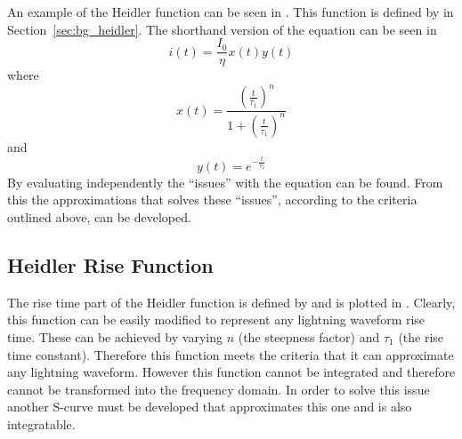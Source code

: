 An example of the Heidler function can be seen in . This function is defined by  in Section~\ref{sec:bg_heidler}.
The shorthand version of the equation can be seen in 
\begin{equation}
i(t) = \frac{I_0}{\eta} x \left( t \right) y \left( t \right)
\label{eqn:HFsmall}
\end{equation}
where
\begin{equation}
	x \left( t \right) = \frac{{\left (\frac{t}{\tau_1} \right )}^n}{1 + {\left (\frac{t}{\tau_1} \right )}^n}
	\label{eqn:HFrise}
\end{equation}
and
\begin{equation}
	y \left( t \right) = e^{-\frac{t}{\tau_2}}
	\label{eqn:HFfall}
\end{equation}
By evaluating  independently the ``issues'' with the equation can be found. From this the approximations that solves these ``issues'', according to the criteria outlined above, can be developed.

\subsection{Heidler Rise Function}
\label{sub:heidler_rise_function}

The rise time part of the Heidler function is defined by  and is plotted in . Clearly, this function can be easily modified to represent any lightning waveform rise time. These can be achieved by varying $n$ (the steepness factor) and $\tau_1$ (the rise time constant).
Therefore this function meets the criteria that it can approximate any lightning waveform. However this function cannot be integrated and therefore cannot be transformed into the frequency domain. In order to solve this issue another S-curve must be developed that approximates this one and is also integratable.

